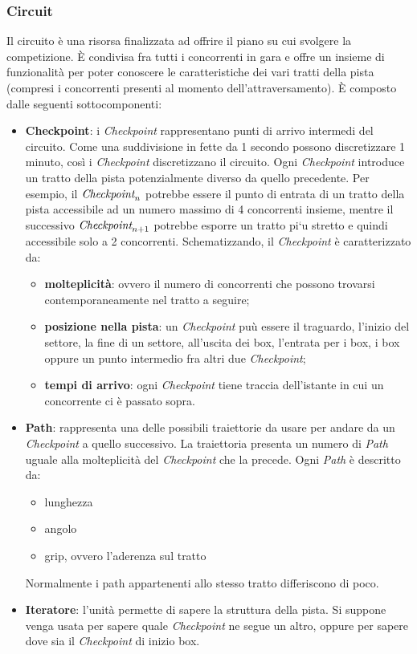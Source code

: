 \subsubsection{Circuit}
Il circuito \`{e} una risorsa finalizzata ad offrire il piano su cui svolgere la competizione. \`{E} condivisa fra tutti i concorrenti in gara e
offre un insieme di funzionalit\`{a} per poter conoscere le caratteristiche dei vari tratti della pista (compresi i concorrenti presenti
al momento dell'attraversamento). \`{E} composto dalle seguenti sottocomponenti:
\begin{itemize}
\item \textbf{Checkpoint}:
i \emph{Checkpoint} rappresentano punti di arrivo intermedi del circuito. Come una suddivisione in fette da 1 secondo possono discretizzare 1 minuto,
cos\`{i} i \emph{Checkpoint} discretizzano il circuito. Ogni \emph{Checkpoint} introduce un tratto della pista potenzialmente diverso da quello precedente.
Per esempio, il $\emph{Checkpoint}_n$ potrebbe essere il punto di entrata di un tratto della pista accessibile ad un numero massimo di 4 concorrenti insieme,
mentre il successivo $\emph{Checkpoint}_{n+1}$ potrebbe esporre un tratto pi`{u} stretto e quindi accessibile solo a 2 concorrenti. Schematizzando, 
il \emph{Checkpoint} \`{e} caratterizzato da:
\begin{itemize}
\item \textbf{molteplicit\`{a}}: ovvero il numero di concorrenti che possono trovarsi contemporaneamente nel tratto a seguire;
\item \textbf{posizione nella pista}: un \emph{Checkpoint} pu\`{u} essere il traguardo, l'inizio del settore, la fine di un settore, all'uscita dei box, l'entrata
					per i box, i box oppure un punto intermedio fra altri due \emph{Checkpoint};
\item \textbf{tempi di arrivo}: ogni \emph{Checkpoint} tiene traccia dell'istante in cui un concorrente ci \`{e} passato sopra.
\end{itemize}
\item \textbf{Path}: rappresenta una delle possibili traiettorie da usare per andare da un \emph{Checkpoint} a quello successivo. La traiettoria presenta
	un numero di \emph{Path} uguale alla molteplicit\`{a} del \emph{Checkpoint} che la precede. Ogni \emph{Path} \`{e} descritto da:
	\begin{itemize}
		\item lunghezza
		\item angolo
		\item grip, ovvero l'aderenza sul tratto
	\end{itemize}
Normalmente i path appartenenti allo stesso tratto differiscono di poco.
\item \textbf{Iteratore}: l'unit\`{a} permette di sapere la struttura della pista. Si suppone venga usata per sapere quale \emph{Checkpoint} ne segue un altro,
	oppure per sapere dove sia il \emph{Checkpoint} di inizio box. 
\end{itemize}
